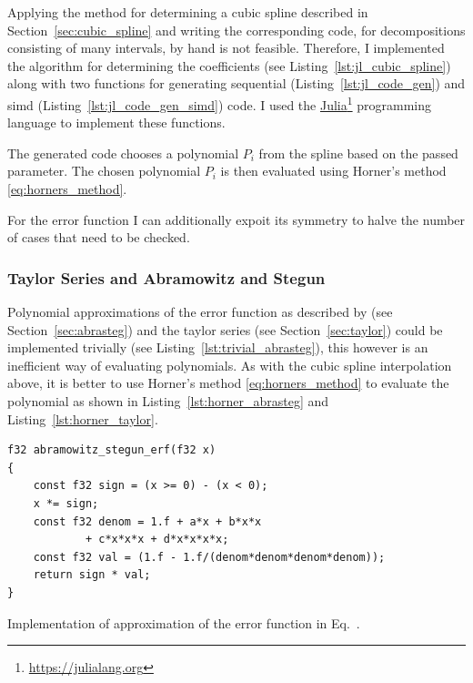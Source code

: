\documentclass[a4paper, 11pt]{memoir}
\begin{document}
    Applying the method for determining a cubic spline described in Section~\ref{sec:cubic_spline} and writing the
    corresponding code, for decompositions consisting of many intervals, by hand is not feasible. Therefore, I implemented 
    the algorithm for determining the coefficients (see Listing~\ref{lst:jl_cubic_spline}) along with two functions for
    generating sequential (Listing~\ref{lst:jl_code_gen}) and \gls{simd} (Listing~\ref{lst:jl_code_gen_simd}) code. I used
    the \href{https://julialang.org}{Julia}\footnote{\href{https://julialang.org}{https://julialang.org}} programming
    language to implement these functions.
    
    The generated code chooses a polynomial $P_i$ from the spline based on the passed parameter. The chosen polynomial
    $P_i$ is then evaluated using Horner's method \eqref{eq:horners_method}.

    For the error function I can additionally expoit its symmetry to halve the number of cases that need to be checked.

    \subsubsection{Taylor Series and Abramowitz and Stegun}
    \label{sec:impl_abrasteg_taylor}
    Polynomial approximations of the error function as described by \citeauthor{AbraSteg72} (see
    Section~\ref{sec:abrasteg}) and the taylor series (see Section~\ref{sec:taylor}) could be implemented trivially (see
    Listing~\ref{lst:trivial_abrasteg}), this however is an inefficient way of evaluating polynomials. As with the cubic
    spline interpolation above, it is better to use Horner's method \eqref{eq:horners_method} to evaluate the polynomial
    as shown in Listing~\ref{lst:horner_abrasteg} and Listing~\ref{lst:horner_taylor}.

    \begin{listing}[t]
        \begin{verbatim}
f32 abramowitz_stegun_erf(f32 x)
{
    const f32 sign = (x >= 0) - (x < 0);
    x *= sign;
    const f32 denom = 1.f + a*x + b*x*x
            + c*x*x*x + d*x*x*x*x;
    const f32 val = (1.f - 1.f/(denom*denom*denom*denom));
    return sign * val;
}
        \end{verbatim}
        \caption{Implementation of approximation of the error function in Eq.~.}
        \label{lst:trivial_abrasteg}
    \end{listing}
\end{document}
